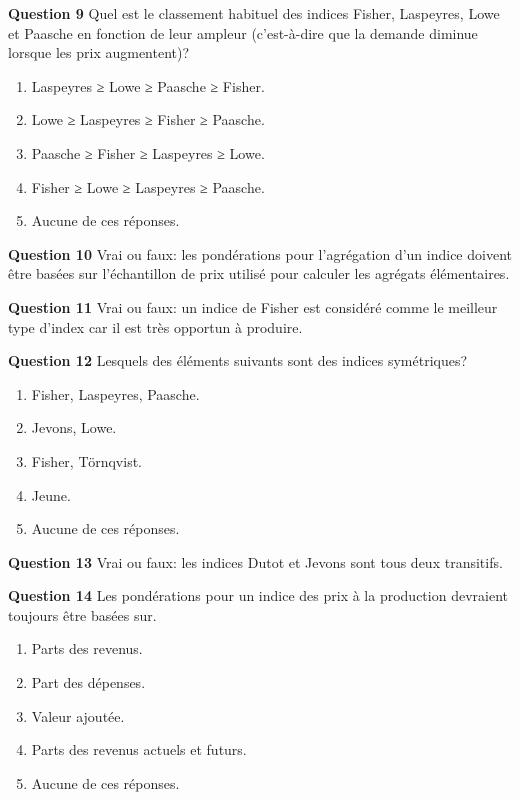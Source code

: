 \documentclass[
]{article}
\begin{document}
\textbf{Question 9} Quel est le classement habituel des indices Fisher, Laspeyres, Lowe et Paasche en fonction de leur ampleur (c'est-à-dire que la demande diminue lorsque les prix augmentent)?

\begin{enumerate}
\def\labelenumi{\alph{enumi})}
\item
  Laspeyres ≥ Lowe ≥ Paasche ≥ Fisher.
\item
  Lowe ≥ Laspeyres ≥ Fisher ≥ Paasche.
\item
  Paasche ≥ Fisher ≥ Laspeyres ≥ Lowe.
\item
  Fisher ≥ Lowe ≥ Laspeyres ≥ Paasche.
\item
  Aucune de ces réponses.
\end{enumerate}

\textbf{Question 10} Vrai ou faux: les pondérations pour l'agrégation d'un indice doivent être basées sur l'échantillon de prix utilisé pour calculer les agrégats élémentaires.

\textbf{Question 11} Vrai ou faux: un indice de Fisher est considéré comme le meilleur type d'index car il est très opportun à produire.

\textbf{Question 12} Lesquels des éléments suivants sont des indices symétriques?

\begin{enumerate}
\def\labelenumi{\alph{enumi})}
\item
  Fisher, Laspeyres, Paasche.
\item
  Jevons, Lowe.
\item
  Fisher, Törnqvist.
\item
  Jeune.
\item
  Aucune de ces réponses.
\end{enumerate}

\textbf{Question 13} Vrai ou faux: les indices Dutot et Jevons sont tous deux transitifs.

\textbf{Question 14} Les pondérations pour un indice des prix à la production devraient toujours être basées sur.

\begin{enumerate}
\def\labelenumi{\alph{enumi})}
\item
  Parts des revenus.
\item
  Part des dépenses.
\item
  Valeur ajoutée.
\item
  Parts des revenus actuels et futurs.
\item
  Aucune de ces réponses.
\end{enumerate}
\end{document}

